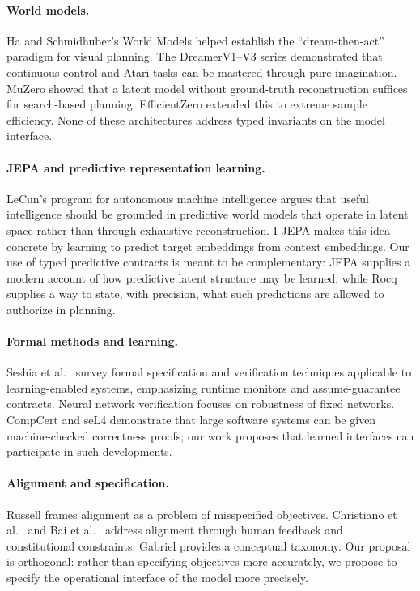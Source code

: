 \documentclass[12pt, a4paper]{article}
\begin{document}
\paragraph{World models.}
Ha and Schmidhuber's World Models \citep{ha2018world} helped establish the
``dream-then-act'' paradigm for visual planning. The DreamerV1--V3 series
\citep{hafner2019dream, hafner2021mastering, hafner2023mastering} demonstrated
that continuous control and Atari tasks can be mastered through pure
imagination. MuZero \citep{schrittwieser2020mastering} showed that a latent
model without ground-truth reconstruction suffices for search-based planning.
EfficientZero \citep{ye2021efficientzero} extended this to extreme sample
efficiency. None of these architectures address typed invariants on the model
interface.

\paragraph{JEPA and predictive representation learning.}
LeCun's program for autonomous machine intelligence \citep{lecun2022path}
argues that useful intelligence should be grounded in predictive world models
that operate in latent space rather than through exhaustive reconstruction.
I-JEPA \citep{assran2023ijepa} makes this idea concrete by learning to predict
target embeddings from context embeddings. Our use of typed predictive
contracts is meant to be complementary: JEPA supplies a modern account of how
predictive latent structure may be learned, while Rocq supplies a way to state,
with precision, what such predictions are allowed to authorize in planning.

\paragraph{Formal methods and learning.}
Seshia et al.\ \citep{seshia2018formal} survey formal specification and
verification techniques applicable to learning-enabled systems, emphasizing
runtime monitors and assume-guarantee contracts. Neural network verification
\citep{katz2019marabou, liu2021algorithms} focuses on robustness of fixed
networks. CompCert \citep{leroy2009compcert} and seL4 \citep{klein2009sel4}
demonstrate that large software systems can be given machine-checked
correctness proofs; our work proposes that learned interfaces can participate
in such developments.

\paragraph{Alignment and specification.}
Russell \citep{russell2019human} frames alignment as a problem of
misspecified objectives. Christiano et al.\ \citep{christiano2017rlhf} and
Bai et al.\ \citep{bai2022training, bai2022constitutional} address alignment
through human feedback and constitutional constraints. Gabriel
\citep{gabriel2020alignment} provides a conceptual taxonomy. Our proposal is
orthogonal: rather than specifying objectives more accurately, we propose to
specify the operational interface of the model more precisely.
\end{document}
